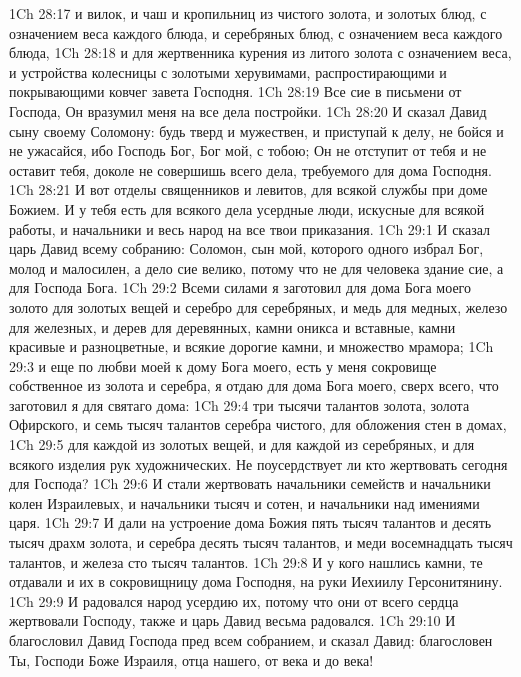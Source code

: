 \vs 1Ch 28:17 и вилок, и чаш и кропильниц из чистого золота, и золотых блюд, с означением веса каждого блюда, и серебряных блюд, с означением веса каждого блюда,
\vs 1Ch 28:18 и для жертвенника курения из литого золота с означением веса, и устройства колесницы с золотыми херувимами, распростирающими  и покрывающими ковчег завета Господня.
\vs 1Ch 28:19 Все сие в письмени от Господа,  Он вразумил меня на все дела постройки.
\rsbpar\vs 1Ch 28:20 И сказал Давид сыну своему Соломону: будь тверд и мужествен, и приступай к делу, не бойся и не ужасайся, ибо Господь Бог, Бог мой, с тобою; Он не отступит от тебя и не оставит тебя, доколе не совершишь всего дела, требуемого для дома Господня.
\vs 1Ch 28:21 И вот отделы священников и левитов, для всякой службы при доме Божием. И у тебя есть для всякого дела усердные люди, искусные для всякой работы, и начальники и весь народ  на все твои приказания.
\vs 1Ch 29:1 И сказал царь Давид всему собранию: Соломон, сын мой, которого одного избрал Бог, молод и малосилен, а дело сие велико, потому что не для человека здание сие, а для Господа Бога.
\vs 1Ch 29:2 Всеми силами я заготовил для дома Бога моего золото для золотых вещей и серебро для серебряных, и медь для медных, железо для железных, и дерев для деревянных, камни оникса и  вставные, камни красивые и разноцветные, и всякие дорогие камни, и множество мрамора;
\vs 1Ch 29:3 и еще по любви моей к дому Бога моего, есть у меня сокровище собственное из золота и серебра,  я отдаю для дома Бога моего, сверх всего, что заготовил я для святаго дома:
\vs 1Ch 29:4 три тысячи талантов золота, золота Офирского, и семь тысяч талантов серебра чистого, для обложения стен в домах,
\vs 1Ch 29:5 для каждой из золотых вещей, и для каждой из серебряных, и для всякого изделия рук художнических. Не поусердствует ли  кто жертвовать сегодня для Господа?
\rsbpar\vs 1Ch 29:6 И стали жертвовать начальники семейств и начальники колен Израилевых, и начальники тысяч и сотен, и начальники над имениями царя.
\vs 1Ch 29:7 И дали на устроение дома Божия пять тысяч талантов и десять тысяч драхм золота, и серебра десять тысяч талантов, и меди восемнадцать тысяч талантов, и железа сто тысяч талантов.
\vs 1Ch 29:8 И у кого нашлись  камни, те отдавали и их в сокровищницу дома Господня, на руки Иехиилу Герсонитянину.
\vs 1Ch 29:9 И радовался народ усердию их, потому что они от всего сердца жертвовали Господу, также и царь Давид весьма радовался.
\rsbpar\vs 1Ch 29:10 И благословил Давид Господа пред всем собранием, и сказал Давид: благословен Ты, Господи Боже Израиля, отца нашего, от века и до века!
